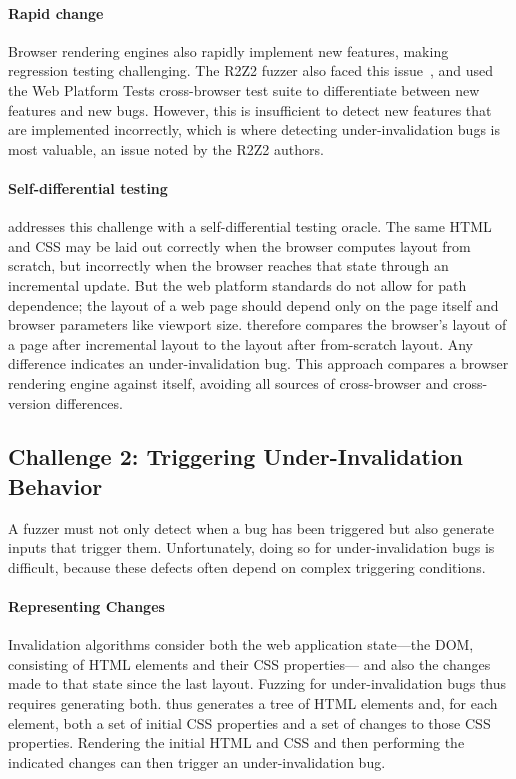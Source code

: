 \paragraph{Rapid change}
Browser rendering engines also rapidly implement new features,
  making regression testing challenging.
The R2Z2 fuzzer also faced this issue~\cite{song2022r2z2},
  and used the Web Platform Tests cross-browser test suite
  to differentiate between new features and new bugs.
However, this is insufficient to detect new features
  that are implemented incorrectly,
  which is where detecting under-invalidation bugs
  is most valuable, an issue noted by the R2Z2 authors.

\paragraph{Self-differential testing}
\toolname addresses this challenge with a self-differential testing oracle.
The same HTML and CSS may be laid out correctly
  when the browser computes layout from scratch,
  but incorrectly when the browser reaches that state through an incremental update. 
But the web platform standards do not allow for path dependence;
  the layout of a web page should depend only on the page itself
  and browser parameters like viewport size.
\toolname therefore compares the browser's layout of a page
  after incremental layout to the layout after from-scratch layout.
Any difference indicates an under-invalidation bug.
This approach compares a browser rendering engine against itself,
  avoiding all sources of cross-browser and cross-version differences.

\subsection{Challenge 2: Triggering Under-Invalidation Behavior}

A fuzzer must not only detect when a bug has been triggered
  but also generate inputs that trigger them.
Unfortunately, doing so for under-invalidation bugs is difficult,
  because these defects often depend on complex triggering conditions.

\paragraph{Representing Changes}
Invalidation algorithms consider both
  the web application state---the DOM,
  consisting of HTML elements and their CSS properties---%
  and also the changes made to that state
  since the last layout.
Fuzzing for under-invalidation bugs thus requires
  generating both.
\toolname thus generates
  a tree of HTML elements and, for each element,
  both a set of initial CSS properties
  and a set of changes to those CSS properties.
Rendering the initial HTML and CSS
  and then performing the indicated changes
  can then trigger an under-invalidation bug.

